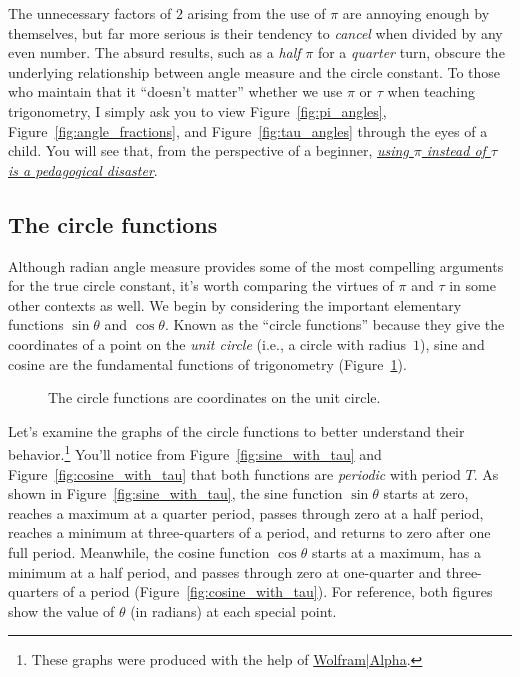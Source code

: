 
The unnecessary factors of $2$ arising from the use of $\pi$ are annoying enough by themselves, but far more serious is their tendency to \emph{cancel} when divided by any even number. The absurd results, such as a \emph{half} $\pi$ for a \emph{quarter} turn, obscure the underlying relationship between angle measure and the circle constant. To those who maintain that it ``doesn't matter'' whether we use $\pi$ or $\tau$ when teaching trigonometry, I simply ask you to view Figure~\ref{fig:pi_angles}, Figure~\ref{fig:angle_fractions}, and Figure~\ref{fig:tau_angles} through the eyes of a child. You will see that, from the perspective of a beginner, \href{http://tauday.com/a-tau-testimonial}{\emph{using $\pi$ instead of $\tau$ is a pedagogical disaster}}.

  \subsection{The circle functions} %
  \label{sec:the_circle_functions}

Although radian angle measure provides some of the most compelling arguments for the true circle constant, it's worth comparing the virtues of $\pi$ and $\tau$ in some other contexts as well. We begin by considering the important elementary functions $\sin\theta$ and $\cos\theta$. Known as the ``circle functions''  because they give the coordinates of a point on the \emph{unit circle} (i.e., a circle with radius~$1$), sine and cosine are the fundamental functions of trigonometry (Figure~\ref{fig:circle_functions}).

\begin{figure}
\begin{center}
\end{center}
\caption{The circle functions are coordinates on the unit circle.\label{fig:circle_functions}}
\end{figure}

Let's examine the graphs of the circle functions to better understand their behavior.\footnote{These graphs were produced with the help of \href{http://www.wolframalpha.com/}{Wolfram|Alpha}.} You'll notice from Figure~\ref{fig:sine_with_tau} and Figure~\ref{fig:cosine_with_tau} that both functions are \emph{periodic} with period $T$. As shown in Figure~\ref{fig:sine_with_tau}, the sine function $\sin\theta$ starts at zero, reaches a maximum at a quarter period, passes through zero at a half period, reaches a minimum at three-quarters of a period, and returns to zero after one full period. Meanwhile, the cosine function $\cos\theta$ starts at a maximum, has a minimum at a half period, and passes through zero at one-quarter and three-quarters of a period  (Figure~\ref{fig:cosine_with_tau}). For reference, both figures show the value of $\theta$ (in radians) at each special point.


